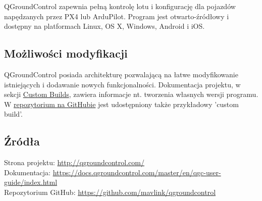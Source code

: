 \documentclass{article}
\begin{document}
QGroundControl zapewnia pełną kontrolę lotu i konfigurację dla pojazdów napędzanych przez PX4 lub ArduPilot. Program jest otwarto-źródłowy i dostępny na platformach Linux, OS X, Windows, Android i iOS.

\subsection{Możliwości modyfikacji}
QGroundControl posiada architekturę pozwalającą na łatwe modyfikowanie istniejących i dodawanie nowych funkcjonalności. Dokumentacja projektu, w sekcji \href{https://docs.qgroundcontrol.com/master/en/qgc-dev-guide/custom_build/custom_build.html}{Custom Builds}, zawiera informacje nt. tworzenia własnych wersji programu.
W \href{https://github.com/mavlink/qgroundcontrol/tree/master/custom-example}{repozytorium na GitHubie} jest udostępniony także przykładowy 'custom build'.

\subsection{Źródła}
Strona projektu: \url{http://qgroundcontrol.com/}\\
Dokumentacja: \url{https://docs.qgroundcontrol.com/master/en/qgc-user-guide/index.html}\\
Repozytorium GitHub: \url{https://github.com/mavlink/qgroundcontrol}
\end{document}
